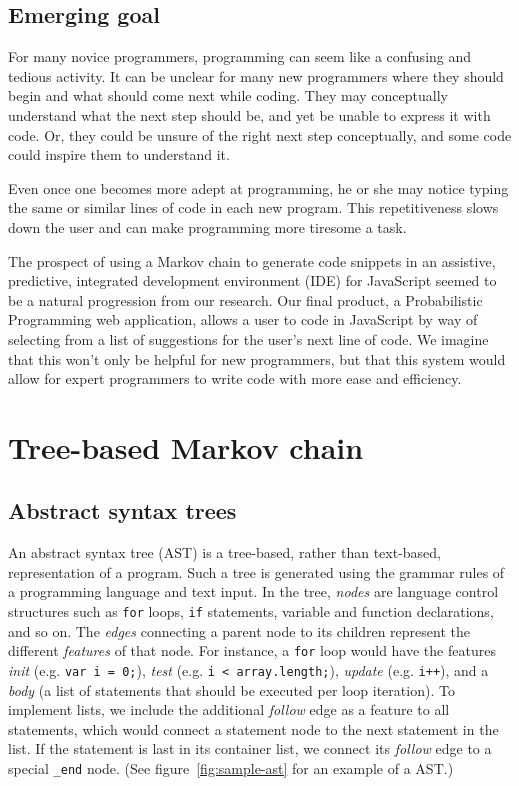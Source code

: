 \documentclass{article}
\begin{document}
\subsection{Emerging goal}

For many novice programmers, programming can seem like a confusing and
tedious activity. It can be unclear for many new programmers where they should
begin and what should come next while coding. They may conceptually understand
what the next step should be, and yet be unable to express it with code. Or, they
could be unsure of the right next step conceptually, and some code could inspire
them to understand it.

Even once one becomes more
adept at programming, he or she may notice typing the same or
similar lines of code in each new program. This repetitiveness slows down
the user and can make programming more tiresome a task.

The prospect of using a Markov chain to generate code snippets in an assistive, predictive, integrated development environment (IDE) for JavaScript seemed to be a natural progression from our research. Our final product, a Probabilistic Programming
web application, allows a user to code in JavaScript by way of selecting from
a list of suggestions for the user's next line of code. We imagine that this won't only be helpful for new programmers,
but that this system would allow for expert programmers to write code with more ease and efficiency.


\section{Tree-based Markov chain}

\subsection{Abstract syntax trees}

An abstract syntax tree (AST) is a tree-based, rather than text-based, representation of a program.
Such a tree is generated using the grammar rules of a programming language and text input. In the tree, \emph{nodes}
are language control structures such as {\tt for} loops, {\tt if} statements, variable and function
declarations, and so on. The \emph{edges} connecting a parent node to its children represent the different \emph{features}
of that node. For instance, a {\tt for} loop would have the features \emph{init} (e.g. {\tt var i = 0;}),
\emph{test} (e.g. {\tt i < array.length;}), \emph{update} (e.g. {\tt i++}), and a \emph{body} (a list
of statements that should be executed per loop iteration). To implement lists, we include the additional
\emph{follow} edge as a feature to all statements, which would connect a statement node to the next statement
in the list. If the statement is last in its container list, we connect its \emph{follow} edge to a special
{\tt {\_end}} node. (See figure~\ref{fig:sample-ast} for an example of a AST.)
\end{document}

